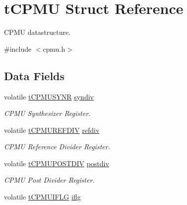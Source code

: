 \hypertarget{structt_c_p_m_u}{}\section{t\+C\+P\+M\+U Struct Reference}
\label{structt_c_p_m_u}


C\+P\+M\+U datastructure.  




{\ttfamily \#include $<$cpmu.\+h$>$}

\subsection*{Data Fields}
\begin{DoxyCompactItemize}
\item 
\hypertarget{structt_c_p_m_u_a2a003b3d5ed6fc3633a2832a198d20c2}{}volatile \hyperlink{unionu_c_p_m_u_s_y_n_r}{t\+C\+P\+M\+U\+S\+Y\+N\+R} \hyperlink{structt_c_p_m_u_a2a003b3d5ed6fc3633a2832a198d20c2}{syndiv}\label{structt_c_p_m_u_a2a003b3d5ed6fc3633a2832a198d20c2}

\begin{DoxyCompactList}\small\item\em C\+P\+M\+U Synthesizer Register. \end{DoxyCompactList}\item 
\hypertarget{structt_c_p_m_u_aed03aeb6dadfd3fe10b584df8a383252}{}volatile \hyperlink{unionu_c_p_m_u_r_e_f_d_i_v}{t\+C\+P\+M\+U\+R\+E\+F\+D\+I\+V} \hyperlink{structt_c_p_m_u_aed03aeb6dadfd3fe10b584df8a383252}{refdiv}\label{structt_c_p_m_u_aed03aeb6dadfd3fe10b584df8a383252}

\begin{DoxyCompactList}\small\item\em C\+P\+M\+U Reference Divider Register. \end{DoxyCompactList}\item 
\hypertarget{structt_c_p_m_u_a55c35c01835d0758df706280d0147785}{}volatile \hyperlink{unionu_c_p_m_u_p_o_s_t_d_i_v}{t\+C\+P\+M\+U\+P\+O\+S\+T\+D\+I\+V} \hyperlink{structt_c_p_m_u_a55c35c01835d0758df706280d0147785}{postdiv}\label{structt_c_p_m_u_a55c35c01835d0758df706280d0147785}

\begin{DoxyCompactList}\small\item\em C\+P\+M\+U Post Divider Register. \end{DoxyCompactList}\item 
\hypertarget{structt_c_p_m_u_a26add02952330ba254c0f4ae7074e77c}{}volatile \hyperlink{unionu_c_p_m_u_i_f_l_g}{t\+C\+P\+M\+U\+I\+F\+L\+G} \hyperlink{structt_c_p_m_u_a26add02952330ba254c0f4ae7074e77c}{iflg}\label{structt_c_p_m_u_a26add02952330ba254c0f4ae7074e77c}


\end{DoxyCompactItemize}
